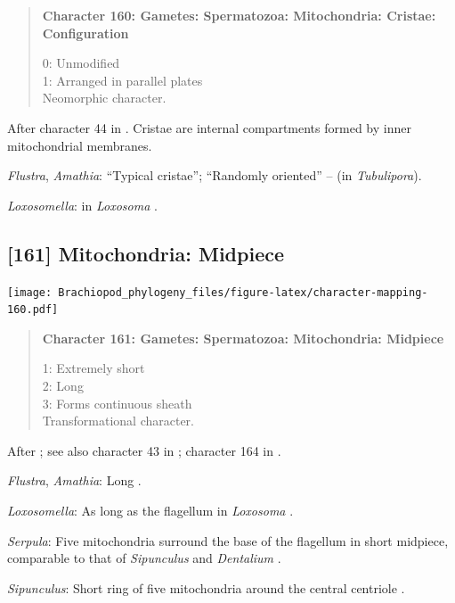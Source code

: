\documentclass[openany]{book}
\begin{document}
\begin{quote}
\textbf{Character 160: Gametes: Spermatozoa: Mitochondria: Cristae:
Configuration}

0: Unmodified\\
1: Arranged in parallel plates\\
Neomorphic character.
\end{quote}

After character 44 in \citet{Ponder1997}. Cristae are internal
compartments formed by inner mitochondrial membranes.

\hypertarget{Amathia-coding-160}{}
\emph{Flustra}, \emph{Amathia}: ``Typical cristae''; ``Randomly
oriented'' -- \citet{Franzen1984} (in \emph{Tubulipora}).

\hypertarget{Loxosomella-coding-160}{}
\emph{Loxosomella}: in \emph{Loxosoma} \citep{Franzen2000}.

\subsection*{{[}161{]} Mitochondria:
Midpiece}\label{mitochondria-midpiece}

\texttt{[image: Brachiopod\_phylogeny\_files/figure-latex/character-mapping-160.pdf]}

\begin{quote}
\textbf{Character 161: Gametes: Spermatozoa: Mitochondria: Midpiece}

1: Extremely short\\
2: Long\\
3: Forms continuous sheath\\
Transformational character.
\end{quote}

After \citet{Smith2012}; see also character 43 in \citet{Ponder1997};
character 164 in \citet{Giribet2002}.

\hypertarget{Amathia-coding-161}{}
\emph{Flustra}, \emph{Amathia}: Long \citep{Franzen1981}.

\hypertarget{Loxosomella-coding-161}{}
\emph{Loxosomella}: As long as the flagellum in \emph{Loxosoma}
\citep{Franzen2000}.

\hypertarget{Serpula-coding-161}{}
\emph{Serpula}: Five mitochondria surround the base of the flagellum in
short midpiece, comparable to that of \emph{Sipunculus} and
\emph{Dentalium} \citep{Gherardi2011}.

\hypertarget{Sipunculus-coding-161}{}
\emph{Sipunculus}: Short ring of five mitochondria around the central
centriole \citep{Rice1993}.
\end{document}
